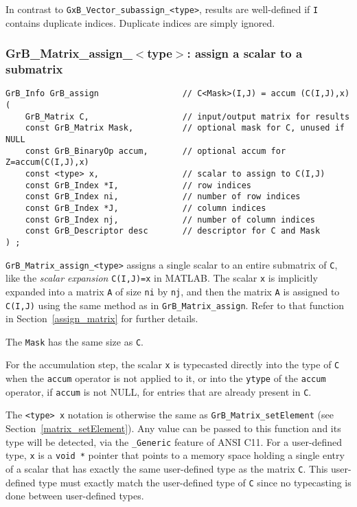 \documentclass[12pt]{article}
\begin{document}
In contrast to \verb'GxB_Vector_subassign_<type>', results are well-defined if
\verb'I' contains duplicate indices.  Duplicate indices are simply ignored.

\subsubsection{{\sf GrB\_Matrix\_assign\_$<$type$>$:} assign a scalar to a submatrix}
\label{assign_matrix_scalar}

\begin{mdframed}[userdefinedwidth=6in]
{\footnotesize
\begin{verbatim}
GrB_Info GrB_assign                 // C<Mask>(I,J) = accum (C(I,J),x)
(
    GrB_Matrix C,                   // input/output matrix for results
    const GrB_Matrix Mask,          // optional mask for C, unused if NULL
    const GrB_BinaryOp accum,       // optional accum for Z=accum(C(I,J),x)
    const <type> x,                 // scalar to assign to C(I,J)
    const GrB_Index *I,             // row indices
    const GrB_Index ni,             // number of row indices
    const GrB_Index *J,             // column indices
    const GrB_Index nj,             // number of column indices
    const GrB_Descriptor desc       // descriptor for C and Mask
) ;
\end{verbatim} } \end{mdframed}

\verb'GrB_Matrix_assign_<type>' assigns a single scalar to an entire
submatrix of \verb'C', like the {\em scalar expansion} \verb'C(I,J)=x' in
MATLAB.  The scalar \verb'x' is implicitly expanded into a matrix \verb'A' of
size \verb'ni' by \verb'nj', and then the matrix \verb'A' is assigned to
\verb'C(I,J)' using the same method as in \verb'GrB_Matrix_assign'.  Refer
to that function in Section~\ref{assign_matrix} for further details.

The \verb'Mask' has the same size as \verb'C'.

For the accumulation step, the scalar \verb'x' is typecasted directly into the
type of \verb'C' when the \verb'accum' operator is not applied to it, or into
the \verb'ytype' of the \verb'accum' operator, if \verb'accum' is not NULL, for
entries that are already present in \verb'C'.

The \verb'<type> x' notation is otherwise the same as
\verb'GrB_Matrix_setElement' (see Section~\ref{matrix_setElement}).  Any value
can be passed to this function and its type will be detected, via the
\verb'_Generic' feature of ANSI C11.  For a user-defined type, \verb'x' is a
\verb'void *' pointer that points to a memory space holding a single entry of a
scalar that has exactly the same user-defined type as the matrix \verb'C'.
This user-defined type must exactly match the user-defined type of \verb'C'
since no typecasting is done between user-defined types.
\end{document}
